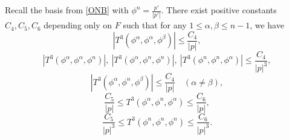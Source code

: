 \documentclass[10pt,a4paper]{amsart}
\begin{document}
\begin{lemma} \label{lem:2.4}
Recall the basis from \eqref{ONB} with $\phi^n = \frac{p'}{|p'|}$. There exist positive constants $C_4, C_5, C_6$ depending only on $F$ such that for any $1\leq \alpha,\beta \leq n-1$, we have 
\begin{equation*}
    |T^3 (\phi^{\alpha}, \phi^{\alpha}, \phi^{\beta})| \leq \frac{C_4}{|p|},
\end{equation*}
\begin{equation*}
     |T^3 (\phi^{\alpha}, \phi^{\alpha}, \phi^{n})|,\ |T^3 (\phi^{\alpha}, \phi^n, \phi^n)|, \  |T^3 (\phi^{n}, \phi^{n}, \phi^{\alpha})| \leq \frac{C_4}{|p|^3},
\end{equation*}
\begin{equation*}
    | T^3 (\phi^{\alpha}, \phi^n, \phi^{\beta})| \leq \frac{C_4}{|p|} \quad (\alpha\neq \beta),
\end{equation*}
\begin{equation*}
     \frac{C_5}{|p|} \leq T^3 (\phi^{\alpha}, \phi^n, \phi^{\alpha}) \leq \frac{C_6}{|p|},
\end{equation*}
\begin{equation*}
\frac{C_5}{|p|^3} \leq T^3 (\phi^{n}, \phi^{n}, \phi^n)  \leq \frac{C_6}{|p|^3}.
\end{equation*}
\end{lemma}
\end{document}

